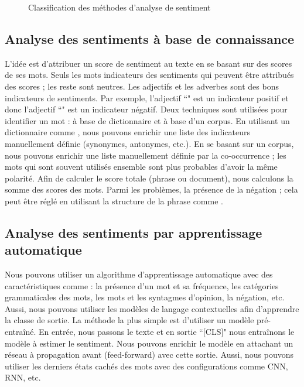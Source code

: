\documentclass{KodeBook}
\begin{document}
\begin{figure}[!ht]
	\centering
	\caption{Classification des méthodes d'analyse de sentiment}
	\label{fig:asent}
\end{figure}

\subsection{Analyse des sentiments à base de connaissance}

L'idée est d'attribuer un score de sentiment au texte en se basant sur des scores de ses mots. 
Seuls les mots indicateurs des sentiments qui peuvent être attribués des scores ; les reste sont neutres.
Les adjectifs et les adverbes sont des bons indicateurs de sentiments. 
Par exemple, l'adjectif ``" est un indicateur positif et donc l'adjectif ``" est un indicateur négatif.
Deux techniques sont utilisées pour identifier un mot : à base de dictionnaire et à base d'un corpus. 
En utilisant un dictionnaire comme , nous pouvons enrichir une liste des indicateurs manuellement définie (synonymes, antonymes, etc.).
En se basant sur un corpus, nous pouvons enrichir une liste manuellement définie par la co-occurrence ; les mots qui sont souvent utilisés ensemble sont plus probables d'avoir la même polarité. 
%
Afin de calculer le score totale (phrase ou document), nous calculons la somme des scores des mots. 
Parmi les problèmes, la présence de la négation ; cela peut être réglé en utilisant la structure de la phrase comme .

\subsection{Analyse des sentiments par apprentissage automatique}

Nous pouvons utiliser un algorithme d'apprentissage automatique avec des caractéristiques comme : la présence d'un mot et sa fréquence, les catégories grammaticales des mots, les mots et les syntagmes d'opinion, la négation, etc.
Aussi, nous pouvons utiliser les modèles de langage contextuelles afin d'apprendre la classe de sortie. 
La méthode la plus simple est d'utiliser un modèle  pré-entraîné.
En entrée, nous passons le texte et en sortie ``[CLS]" nous entraînons le modèle à estimer le sentiment. 
Nous pouvons enrichir le modèle en attachant un réseau à propagation avant (feed-forward) avec cette sortie. 
Aussi, nous pouvons utiliser les derniers états cachés des mots avec des configurations comme CNN, RNN, etc.
\end{document}
